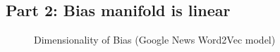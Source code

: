 \documentclass{article}
\begin{document}
\subsection{Part 2: Bias manifold is linear}

\begin{figure}[H]
    \centering
    \qquad
\caption{Dimensionality of Bias (Google News Word2Vec model)}
    \label{fig:bias_manifold_google_news}
\end{figure}
\end{document}
